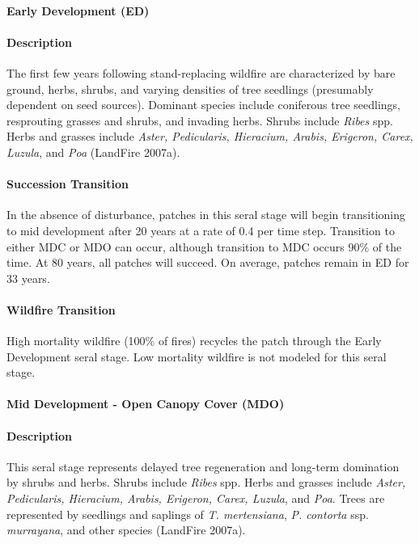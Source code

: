\paragraph*{Early Development (ED)}

\paragraph*{Description} The first few years following stand-replacing wildfire are characterized by bare ground, herbs, shrubs, and varying densities of tree seedlings (presumably dependent on seed sources). Dominant species include coniferous tree seedlings, resprouting grasses and shrubs, and invading herbs. Shrubs include \emph{Ribes} spp. Herbs and grasses include \emph{Aster, Pedicularis, Hieracium, Arabis, Erigeron, Carex, Luzula}, and \emph{Poa} (LandFire 2007a).

\paragraph*{Succession Transition} In the absence of disturbance, patches in this seral stage will begin transitioning to mid development after 20 years at a rate of 0.4 per time step. Transition to either MDC or MDO can occur, although transition to MDC occurs 90\% of the time. At 80 years, all patches will succeed. On average, patches remain in ED for 33 years.

\paragraph*{Wildfire Transition} High mortality wildfire (100\% of fires) recycles the patch through the Early Development seral stage. Low mortality wildfire is not modeled for this seral stage.

\noindent\hrulefill


\paragraph*{Mid Development - Open Canopy Cover (MDO)} 

\paragraph*{Description} This seral stage represents delayed tree regeneration and long-term domination by shrubs and herbs. Shrubs include \emph{Ribes} spp. Herbs and grasses include \emph{Aster, Pedicularis, Hieracium, Arabis, Erigeron, Carex, Luzula}, and \emph{Poa}. Trees are represented by seedlings and saplings of \emph{T. mertensiana}, \emph{P. contorta} ssp. \emph{murrayana}, and other species (LandFire 2007a).


